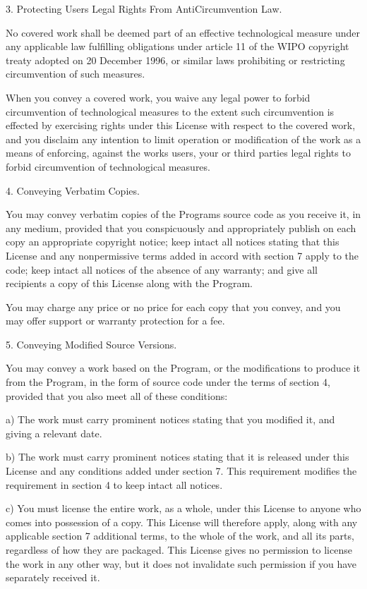 \documentclass[letterpaper,10pt,english]{sphinxmanual}
\begin{document}
\begin{sphinxVerbatim}[commandchars=\\\{\}]
  3. Protecting Users\PYGZsq{} Legal Rights From Anti\PYGZhy{}Circumvention Law.

  No covered work shall be deemed part of an effective technological
measure under any applicable law fulfilling obligations under article
11 of the WIPO copyright treaty adopted on 20 December 1996, or
similar laws prohibiting or restricting circumvention of such
measures.

  When you convey a covered work, you waive any legal power to forbid
circumvention of technological measures to the extent such circumvention
is effected by exercising rights under this License with respect to
the covered work, and you disclaim any intention to limit operation or
modification of the work as a means of enforcing, against the work\PYGZsq{}s
users, your or third parties\PYGZsq{} legal rights to forbid circumvention of
technological measures.

  4. Conveying Verbatim Copies.

  You may convey verbatim copies of the Program\PYGZsq{}s source code as you
receive it, in any medium, provided that you conspicuously and
appropriately publish on each copy an appropriate copyright notice;
keep intact all notices stating that this License and any
non\PYGZhy{}permissive terms added in accord with section 7 apply to the code;
keep intact all notices of the absence of any warranty; and give all
recipients a copy of this License along with the Program.

  You may charge any price or no price for each copy that you convey,
and you may offer support or warranty protection for a fee.

  5. Conveying Modified Source Versions.

  You may convey a work based on the Program, or the modifications to
produce it from the Program, in the form of source code under the
terms of section 4, provided that you also meet all of these conditions:

    a) The work must carry prominent notices stating that you modified
    it, and giving a relevant date.

    b) The work must carry prominent notices stating that it is
    released under this License and any conditions added under section
    7.  This requirement modifies the requirement in section 4 to
    \PYGZdq{}keep intact all notices\PYGZdq{}.

    c) You must license the entire work, as a whole, under this
    License to anyone who comes into possession of a copy.  This
    License will therefore apply, along with any applicable section 7
    additional terms, to the whole of the work, and all its parts,
    regardless of how they are packaged.  This License gives no
    permission to license the work in any other way, but it does not
    invalidate such permission if you have separately received it.


\end{sphinxVerbatim}
\end{document}
